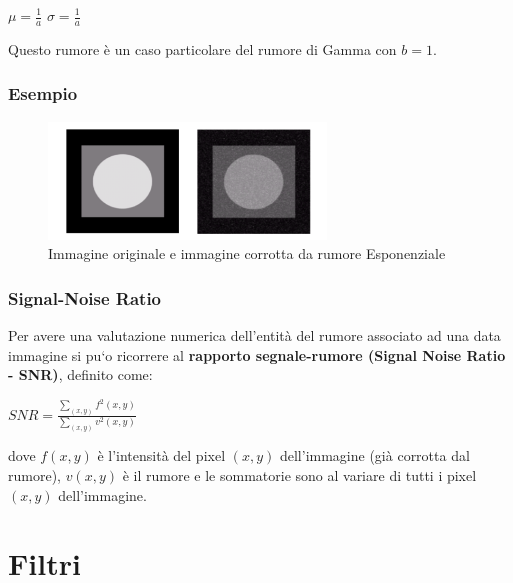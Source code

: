 
\begin{center}
    $\mu = \frac{1}{a}$ $\sigma = \frac{1}{a}$
\end{center}

Questo rumore è un caso particolare del rumore di Gamma con $b = 1$.

\subsubsection{Esempio}

\begin{figure}[H]
    \centering
    \includegraphics[width=\linewidth, keepaspectratio]{capitoli/immagini/imgs/esempio-esponenziale.png}
    \caption*{Immagine originale e immagine corrotta da rumore Esponenziale}
\end{figure}

\subsubsection{Signal-Noise Ratio}

Per avere una valutazione numerica dell’entità del rumore associato ad una data immagine si pu`o ricorrere al \textbf{rapporto segnale-rumore
    (Signal Noise Ratio - SNR)}, definito come:

\begin{center}
    $
        SNR = \frac{\sum_{(x,y)}^{}f^2(x,y)}{\sum_{(x,y)}^{}v^2(x,y)}
    $
\end{center}

dove $f(x, y)$ è l’intensità del pixel $(x, y)$ dell’immagine (già corrotta dal rumore), $v(x, y)$ è il rumore e le sommatorie sono al
variare di tutti i pixel $(x, y)$ dell’immagine.

\section{Filtri}

